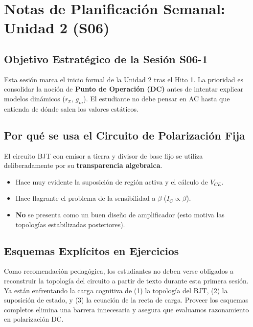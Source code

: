 \documentclass[11pt, a4paper]{article}
\begin{document}
\section*{Notas de Planificación Semanal: Unidad 2 (S06)}

\subsection*{Objetivo Estratégico de la Sesión S06-1}
Esta sesión marca el inicio formal de la Unidad 2 tras el Hito 1. La prioridad es consolidar la noción de \textbf{Punto de Operación (DC)} antes de intentar explicar modelos dinámicos ($r_\pi$, $g_m$). El estudiante no debe pensar en AC hasta que entienda de dónde salen los valores estáticos.

\subsection*{Por qué se usa el Circuito de Polarización Fija}
El circuito BJT con emisor a tierra y divisor de base fijo se utiliza deliberadamente por su \textbf{transparencia algebraica}.
\begin{itemize}
    \item Hace muy evidente la suposición de región activa y el cálculo de $V_{CE}$.
    \item Hace flagrante el problema de la sensibilidad a $\beta$ ($I_C \propto \beta$).
    \item \textbf{No} se presenta como un buen diseño de amplificador (esto motiva las topologías estabilizadas posteriores).
\end{itemize}

\subsection*{Esquemas Explícitos en Ejercicios}
Como recomendación pedagógica, los estudiantes no deben verse obligados a reconstruir la topología del circuito a partir de texto durante esta primera sesión. Ya están enfrentando la carga cognitiva de (1) la topología del BJT, (2) la suposición de estado, y (3) la ecuación de la recta de carga. Proveer los esquemas completos elimina una barrera innecesaria y asegura que evaluamos razonamiento en polarización DC.
\end{document}
